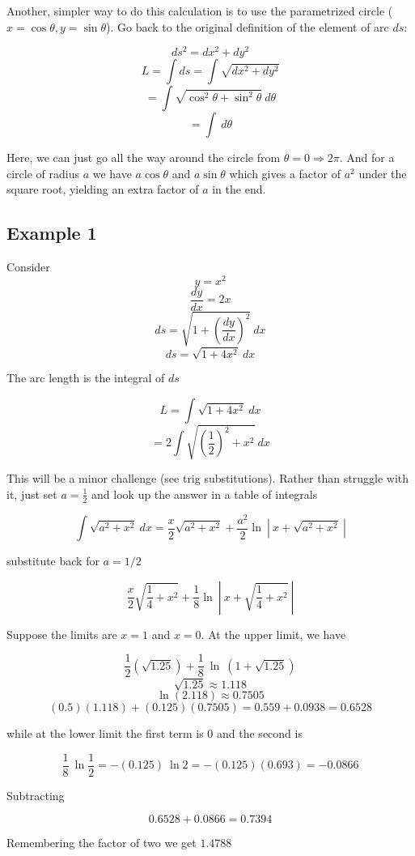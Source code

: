 \documentclass[11pt, oneside]{article}   	%
\begin{document}
Another, simpler way to do this calculation is to use the parametrized circle ($x = \cos \theta, y = \sin \theta$).  Go back to the original definition of the element of arc $ds$:

\[ ds^2 = dx^2 + dy^2 \]
\[ L = \int ds = \int \sqrt{dx^2 + dy^2} \]
\[ = \int \sqrt{\cos^2 \theta + \sin^2 \theta} \ d \theta \]
\[ = \int \ d \theta \]

Here, we can just go all the way around the circle from $\theta = 0 \Rightarrow 2 \pi$.  And for a circle of radius $a$ we have $a \cos \theta$ and $a \sin \theta$ which gives a factor of $a^2$ under the square root, yielding an extra factor of $a$ in the end.

\subsection*{Example 1}
Consider
\[ y = x^2 \]
\[ \frac{dy}{dx} = 2x \]
\[ ds = \sqrt{1 + (\frac{dy}{dx})^2} \ dx \]
\[ ds =  \sqrt{1 + 4x^2} \ dx \]

The arc length is the integral of $ds$

\[ L = \int  \sqrt{1 + 4x^2} \ dx \]
\[ = 2 \int  \sqrt{(\frac{1}{2})^2 + x^2} \ dx \]

This will be a minor challenge (see trig substitutions).  Rather than struggle with it, just set $a = \frac{1}{2}$ and look up the answer in a table of integrals

\[ \int  \sqrt{a^2 + x^2} \ dx  = \frac{x}{2}\sqrt{a^2 + x^2} + \frac{a^2}{2} \ln \ | \ x + \sqrt{a^2 + x^2} \ | \]

substitute back for $a = 1/2$

\[ \frac{x}{2}\sqrt{\frac{1}{4} + x^2} + \frac{1}{8} \ln \ | \ x + \sqrt{\frac{1}{4} + x^2} \ | \]

Suppose the limits are $x=1$ and $x=0$.  At the upper limit, we have

\[ \frac{1}{2}(\sqrt{1.25}) + \frac{1}{8} \ \ln \ (1 + \sqrt{1.25}) \] 
\[ \sqrt{1.25} \approx 1.118  \]
\[ \ln (2.118) \approx 0.7505 \]
\[ (0.5)(1.118) + (0.125)(0.7505) = 0.559 + 0.0938 = 0.6528 \]

while at the lower limit the first term is $0$ and the second is

\[ \frac{1}{8}\  \ln \frac{1}{2} = - (0.125)\  \ln 2 = - (0.125)(0.693) = -0.0866 \] 

Subtracting

\[ 0.6528 + 0.0866 = 0.7394 \]

Remembering the factor of two we get $1.4788$
\end{document}
